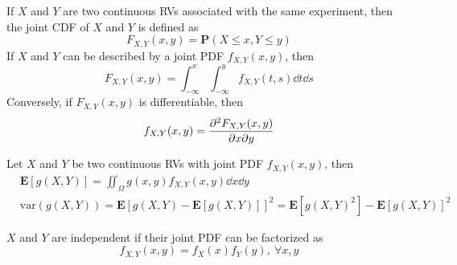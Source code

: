 \documentclass[device=normal, lang=en]{elegantbook}
\numberwithin{equation}{section}
\begin{document}
\begin{definition}
    If $X$ and $Y$ are two continuous RVs associated with the same experiment, then the joint CDF of $X$ and $Y$ is defined as
    \begin{equation}
        F_{X, Y}(x, y) = \mathbf{P}(X \leq x, Y \leq y)
    \end{equation}
    If $X$ and $Y$ can be described by a joint PDF $f_{X, Y}(x, y)$, then
    \begin{equation}
        F_{X, Y}(x, y) = \int_{-\infty}^{x} \int_{-\infty}^{y} f_{X, Y}(t, s) \dd{t} \dd{s}
    \end{equation}
    Conversely, if $F_{X, Y}(x, y)$ is differentiable, then
    \begin{equation}
        f_{X, Y}(x, y) = \pdv{F_{X, Y}(x, y)}{x}{y}
    \end{equation}
\end{definition}

\begin{definition}
    Let $X$ and $Y$ be two continuous RVs with joint PDF $f_{X, Y}(x, y)$, then
    \begin{equation}
    \begin{aligned}
        &\mathbf{E}[g(X, Y)] = \iint_{\Omega} g(x, y) f_{X, Y}(x, y) \dd{x} \dd{y} \\ 
        &\text{var}(g(X, Y)) = \mathbf{E}[g(X, Y) - \mathbf{E}[g(X, Y)]]^2 = \mathbf{E}[g(X, Y)^2] - \mathbf{E}[g(X, Y)]^2
    \end{aligned}
    \end{equation}
\end{definition}

\begin{definition}[Independence]
    $X$ and $Y$ are independent if their joint PDF can be factorized as
    \begin{equation}
        f_{X, Y}(x, y) = f_{X}(x) f_{Y}(y), ~\forall x, y
    \end{equation}
\end{definition}
\end{document}
